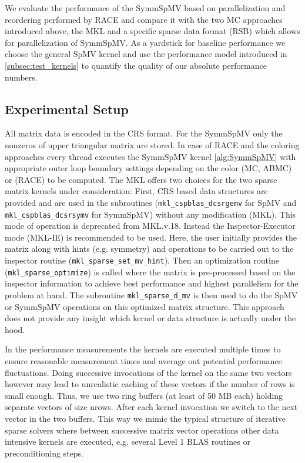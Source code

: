 
We evaluate the performance of the \acrshort{SymmSpMV} based on parallelization and reordering performed by \acrshort{RACE} and compare it with the two MC approaches introduced above, the \acrshort{MKL} and a specific sparse data format (RSB) which allows for parallelization of \acrshort{SymmSpMV}. 
As a yardstick for baseline performance we choose the general \acrshort{SpMV} kernel and use the performance model introduced in \cref{subsec:test_kernels} to quantify the quality of our absolute performance numbers. 

\subsection{Experimental Setup}

All matrix data is encoded in the CRS format. For the \acrshort{SymmSpMV}  only the nonzeros of upper triangular matrix are stored. In case of RACE and the coloring approaches every thread executes the \acrshort{SymmSpMV} kernel \cref{alg:SymmSpMV} with appropriate outer loop boundary settings depending on the color (MC, ABMC) or \levelGroups (\acrshort{RACE}) to be computed.
The  \acrshort{MKL} offers two choices for the two sparse matrix kernels under consideration: First, CRS based data structures are provided and are used in the subroutines (\texttt{mkl\_cspblas\_dcsrgemv} for \acrshort{SpMV}  and  \texttt{mkl\_cspblas\_dcsrsymv} for \acrshort{SymmSpMV}) without any modification (MKL). This mode of operation is deprecated from \acrshort{MKL}.v.18. Instead the Inspector-Executor mode (MKL-IE) is recommended to be used. Here, the user initially provides the matrix along with hints (e.g. symmetry) and operations to be carried out to the inspector routine (\texttt{mkl\_sparse\_set\_mv\_hint}). Then an optimization routine (\texttt{mkl\_sparse\_optimize}) is called where the matrix is  pre-processed based on the inspector information to achieve best performance and highest parallelism for the problem at hand. The subroutine \texttt{mkl\_sparse\_d\_mv} is then used to do the \acrshort{SpMV} or \acrshort{SymmSpMV} operations on this optimized matrix structure. This approach does not provide any insight which kernel or data structure is actually  under the hood.

In the performance measurements the kernels are executed multiple times \inorder to ensure reasonable measurement times and average out potential performance fluctuations. Doing successive invocations of the kernel on the same two vectors however may lead to unrealistic caching of these vectors if the number of rows is small enough. Thus, we use two ring buffers (at least of 50 MB each) holding separate vectors of size \acrshort{nrows}. After each kernel invocation we switch to the next vector in the two buffers. This way we mimic the typical structure of iterative sparse solvers where between successive matrix vector operations other data intensive kernels are executed, e.g. several Level 1 BLAS routines or preconditioning steps. 

